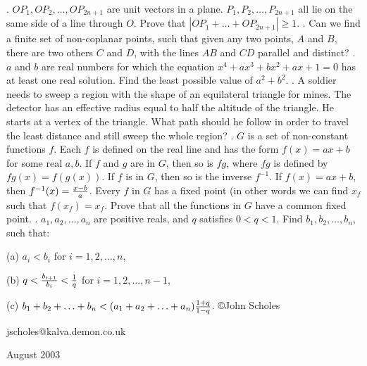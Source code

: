 \nopagenumbers
{}
\vskip 25pt
. $OP_1,OP_2,\ldots,OP_{2n+1}$ are unit vectors in a plane. $P_1,P_2,\ldots,P_{2n+1}$ all lie on the same side of a line through $O$. Prove that $|OP_1+\ldots+OP_{2n+1}|\ge1$.
\vskip 12pt
. Can we find a finite set of non-coplanar points, such that given any two points, $A$ and $B$, there are two others $C$ and $D$, with the lines $AB$ and $CD$ parallel and distinct?
\vskip 12pt
. $a$ and $b$ are real numbers for which the equation $x^4+ax^3+bx^2+ax+1=0$ has at least one real solution. Find the least possible value of $a^2+b^2$.
\vskip 12pt
. A soldier needs to sweep a region with the shape of an equilateral triangle for mines. The detector has an effective radius equal to half the altitude of the triangle. He starts at a vertex of the triangle. What path should he follow in order to travel the least distance and still sweep the whole region?
\vskip 12pt
. $G$ is a set of non-constant functions $f$. Each $f$ is defined on the real line and has the form $f(x)=ax+b$ for some real $a,b$. If $f$ and $g$ are in $G$, then so is $fg$, where $fg$ is defined by $fg(x)=f(g(x))$. If $f$ is in $G$, then so is the inverse $f^{-1}$. If $f(x)=ax+b$, then $f^{-1}(x)={x-b\over a}$. Every $f$ in $G$ has a fixed point (in other words we can find $x_f$ such that $f(x_f)=x_f$. Prove that all the functions in $G$ have a common fixed point.
\vskip 12pt
. $a_1,a_2,\ldots,a_n$ are positive reals, and $q$ satisfies $0<q<1$. Find $b_1,b_2,\ldots,b_n$, such that:

(a) $a_i<b_i$ for $i=1,2,\ldots,n$,

(b) $q<{b_{i+1}\over b_i}<{1\over q}$ for $i=1,2,\ldots,n-1$,

(c) $b_1+b_2+\ldots+b_n<(a_1+a_2+\ldots+a_n){1+q\over1-q}$.
\vskip 20pt
\noindent \copyright John Scholes

\noindent jscholes@kalva.demon.co.uk

 August 2003

\bye
